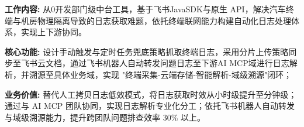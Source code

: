 \documentclass{resume}
\begin{document}
 \vspace{0.05cm}
\begin {itemize}
{\small
\item \textbf {工作内容:} 从0开发部门级中台工具，基于飞书JavaSDK与原生 API，解决汽车终端与机房物理隔离导致的日志获取难题，依托终端联网能力构建自动化日志处理体系，实现上下游协同。
 \vspace{0.1cm}
\item \textbf {核心功能:}
设计手动触发与定时任务兜底策略抓取终端日志，采用分片上传策略同步至飞书云文档，通过飞书机器人自动转发问题日志至下游AI MCP域进行日志解析，并溯源至具体业务域，实现 "终端采集-云端存储-智能解析-域级溯源"闭环；
 \vspace{0.1cm}
\item \textbf {业务价值:} 替代人工拷贝日志低效模式，将日志获取时效从小时级提升至分钟级；通过与 AI MCP 团队协同，实现日志解析专业化分工；依托飞书机器人自动转发与域级溯源能力，提升跨团队问题排查效率 30\% 以上。
}
\end {itemize}
 \vspace{0.05cm}
\end{document}
